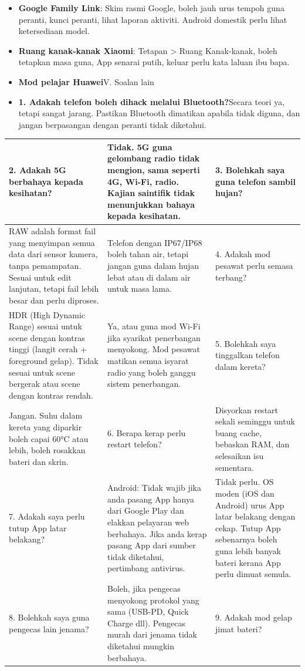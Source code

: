 
\begin{itemize}
  \item \textbf{Google Family Link}: Skim rasmi Google, boleh jauh urus tempoh guna peranti, kunci peranti, lihat laporan aktiviti. Android domestik perlu lihat ketersediaan model.
  \item \textbf{Ruang kanak-kanak Xiaomi}: Tetapan > Ruang Kanak-kanak, boleh tetapkan masa guna, App senarai putih, keluar perlu kata laluan ibu bapa.
  \item \textbf{Mod pelajar Huawei}V. Soalan lain
  \item \textbf{1. Adakah telefon boleh dihack melalui Bluetooth?}Secara teori ya, tetapi sangat jarang. Pastikan Bluetooth dimatikan apabila tidak diguna, dan jangan berpasangan dengan peranti tidak diketahui.
\end{itemize}

\begin{center}
\begin{tabularx}{\linewidth}{|X|X|X|}
\hline
\textbf{2. Adakah 5G berbahaya kepada kesihatan?} & \textbf{Tidak. 5G guna gelombang radio tidak mengion, sama seperti 4G, Wi-Fi, radio. Kajian saintifik tidak menunjukkan bahaya kepada kesihatan.} & \textbf{3. Bolehkah saya guna telefon sambil hujan?} \tabularnewline
\hline
RAW adalah format fail yang menyimpan semua data dari sensor kamera, tanpa pemampatan. Sesuai untuk edit lanjutan, tetapi fail lebih besar dan perlu diproses. & Telefon dengan IP67/IP68 boleh tahan air, tetapi jangan guna dalam hujan lebat atau di dalam air untuk masa lama. & 4. Adakah mod pesawat perlu semasa terbang? \tabularnewline
HDR (High Dynamic Range) sesuai untuk scene dengan kontras tinggi (langit cerah + foreground gelap). Tidak sesuai untuk scene bergerak atau scene dengan kontras rendah. & Ya, atau guna mod Wi-Fi jika syarikat penerbangan menyokong. Mod pesawat matikan semua isyarat radio yang boleh ganggu sistem penerbangan. & 5. Bolehkah saya tinggalkan telefon dalam kereta? \tabularnewline
Jangan. Suhu dalam kereta yang diparkir boleh capai 60°C atau lebih, boleh rosakkan bateri dan skrin. & 6. Berapa kerap perlu restart telefon? & Disyorkan restart sekali seminggu untuk buang cache, bebaskan RAM, dan selesaikan isu sementara. \tabularnewline
7. Adakah saya perlu tutup App latar belakang? & Android: Tidak wajib jika anda pasang App hanya dari Google Play dan elakkan pelayaran web berbahaya. Jika anda kerap pasang App dari sumber tidak diketahui, pertimbang antivirus. & Tidak perlu. OS moden (iOS dan Android) urus App latar belakang dengan cekap. Tutup App sebenarnya boleh guna lebih banyak bateri kerana App perlu dimuat semula. \tabularnewline
8. Bolehkah saya guna pengecas lain jenama? & Boleh, jika pengecas menyokong protokol yang sama (USB-PD, Quick Charge dll). Pengecas murah dari jenama tidak diketahui mungkin berbahaya. & 9. Adakah mod gelap jimat bateri? \tabularnewline
\hline
\end{tabularx}
\end{center}

